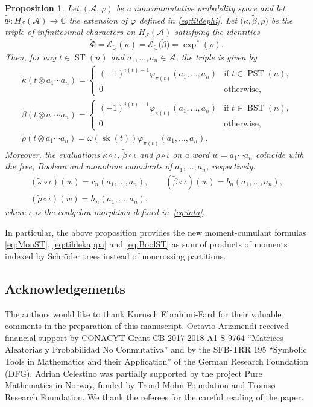 \documentclass[pdftex]{sigma}%
\numberwithin{equation}{section}
\newtheorem{Proposition}[Theorem]{Proposition}
 { \theoremstyle{definition}
\newtheorem{Definition}[Theorem]{Definition}
\newtheorem{Example}[Theorem]{Example}
\newtheorem{Remark}[Theorem]{Remark} }
\newcommand{\A}{\mathcal{A}}
\newcommand{\ST}{\operatorname{ST}}
\newcommand{\cHS}{H_\mathcal{S}}
\newcommand{\sk}{\operatorname{sk}}
\begin{document}
\begin{Proposition}Let $(\A,\varphi)$ be a noncommutative probability space and let $\tilde\Phi\colon \cHS(\A)\to\mathbb{C}$ the extension of $\varphi$ defined in \eqref{eq:tildephi}. Let $\big(\tilde\kappa,\tilde\beta,\tilde\rho\big)$ be the triple of infinitesimal characters on $\cHS(\A)$ satisfying the identities \[\tilde\Phi = \mathcal{E}_{\tilde\prec}(\tilde\kappa)= \mathcal{E}_{\tilde\succ}\big(\tilde\beta\big) = \exp^*(\tilde\rho).\]
Then, for any $t\in \ST(n)$ and $a_1,\dots,a_n\in\mathcal{A}$, the triple is given by
\begin{gather*}
	\tilde\kappa(t \otimes a_1\cdots a_n)
	= \begin{cases} (-1)^{i(t)-1}\varphi_{\pi(t)}(a_1,\dots,a_n) & \text{if $t\in \operatorname{PST}(n)$,}\\ 0& \text{otherwise,} \end{cases}
	\\ \tilde\beta(t \otimes a_1\cdots a_n)
	= \begin{cases} (-1)^{i(t)-1}\varphi_{\pi(t)}(a_1,\dots,a_n) & \text{if $t\in \operatorname{BST}(n)$,}\\ 0& \text{otherwise,} \end{cases}
	\\ \tilde\rho(t\otimes a_1\cdots a_n) = \omega(\sk(t)) \varphi_{\pi(t)}(a_1,\dots,a_n).
\end{gather*}
Moreover, the evaluations $\tilde\kappa\circ \iota$, $\tilde\beta\circ\iota$ and $\tilde\rho\circ \iota$ on a word $w = a_1\cdots a_n$ coincide with the free, Boolean and monotone cumulants of $a_1,\dots,a_n$, respectively:
\begin{gather*}
(\tilde\kappa\circ \iota)(w) = r_n(a_1,\dots,a_n), \qquad (\tilde\beta\circ\iota)(w) = b_n(a_1,\dots,a_n),\\ (\tilde\rho\circ \iota)(w) = h_n(a_1,\dots,a_n),
\end{gather*}
where $\iota$ is the coalgebra morphism defined in~\eqref{eq:iota}.
\end{Proposition}
In particular, the above proposition provides the new moment-cumulant formulas \eqref{eq:MonST}, \eqref{eq:tildekappa} and \eqref{eq:BoolST} as sum of products of moments indexed by Schr\"oder trees instead of noncrossing partitions.

\subsection*{Acknowledgements}
The authors would like to thank Kurusch Ebrahimi-Fard for their valuable comments in the preparation of this manuscript. Octavio Arizmendi received financial support by CONACYT Grant CB-2017-2018-A1-S-9764 ``Matrices Aleatorias y Probabilidad No Conmutativa'' and by the SFB-TRR 195 ``Symbolic Tools in Mathematics and their Application'' of the German Research Foundation (DFG). Adrian Celestino was partially supported by the project Pure Mathematics in Norway, funded by Trond Mohn Foundation and Troms{\o} Research Foundation. We thank the referees for the careful reading of the paper.
\end{document}
